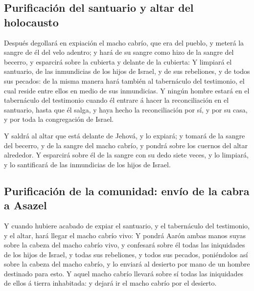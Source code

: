 \hypertarget{purificaciuxf3n-del-santuario-y-altar-del-holocausto}{%
\subsection{Purificación del santuario y altar del
holocausto}\label{purificaciuxf3n-del-santuario-y-altar-del-holocausto}}

 Después degollará en expiación el macho cabrío, que era
del pueblo, y meterá la sangre de él del velo adentro; y hará de su
sangre como hizo de la sangre del becerro, y esparcirá sobre la cubierta
y delante de la cubierta:  Y limpiará el santuario, de
las inmundicias de los hijos de Israel, y de sus rebeliones, y de todos
sus pecados: de la misma manera hará también al tabernáculo del
testimonio, el cual reside entre ellos en medio de sus inmundicias.
 Y ningún hombre estará en el tabernáculo del testimonio
cuando él entrare á hacer la reconciliación en el santuario, hasta que
él salga, y haya hecho la reconciliación por sí, y por su casa, y por
toda la congregación de Israel.

 Y saldrá al altar que está delante de Jehová, y lo
expiará; y tomará de la sangre del becerro, y de la sangre del macho
cabrío, y pondrá sobre los cuernos del altar alrededor. 
Y esparcirá sobre él de la sangre con su dedo siete veces, y lo
limpiará, y lo santificará de las inmundicias de los hijos de Israel.

\hypertarget{purificaciuxf3n-de-la-comunidad-envuxedo-de-la-cabra-a-asazel}{%
\subsection{Purificación de la comunidad: envío de la cabra a
Asazel}\label{purificaciuxf3n-de-la-comunidad-envuxedo-de-la-cabra-a-asazel}}

 Y cuando hubiere acabado de expiar el santuario, y el
tabernáculo del testimonio, y el altar, hará llegar el macho cabrío
vivo:  Y pondrá Aarón ambas manos suyas sobre la cabeza
del macho cabrío vivo, y confesará sobre él todas las iniquidades de los
hijos de Israel, y todas sus rebeliones, y todos sus pecados,
poniéndolos así sobre la cabeza del macho cabrío, y lo enviará al
desierto por mano de un hombre destinado para esto.  Y
aquel macho cabrío llevará sobre sí todas las iniquidades de ellos á
tierra inhabitada: y dejará ir el macho cabrío por el desierto.

